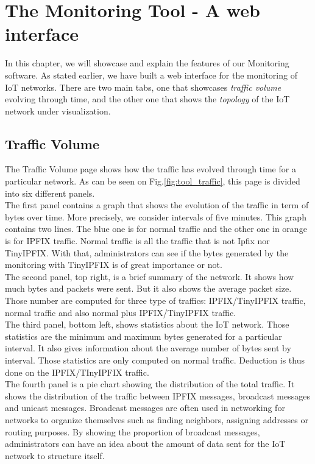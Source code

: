 \chapter{The Monitoring Tool - A web interface}

In this chapter, we will showcase and explain the features of our Monitoring software. As stated earlier, we have built a web interface for the monitoring of IoT networks. There are two main tabs, one that showcases \textit{traffic volume} evolving through time, and the other one that shows the \textit{topology} of the IoT network under visualization.

\section{Traffic Volume}

The Traffic Volume page shows how the traffic has evolved through time for a particular network. As can be seen on Fig.\ref{fig:tool_traffic}, this page is divided into six different panels. \\

The first panel contains a graph that shows the evolution of the traffic in term of bytes over time. More precisely, we consider intervals of five minutes. This graph contains two lines. The blue one is for normal traffic and the other one in orange is for IPFIX traffic. Normal traffic is all the traffic that is not Ipfix nor TinyIPFIX. With that, administrators can see if the bytes generated by the monitoring with TinyIPFIX is of great importance or not. \\

The second panel, top right, is a brief summary of the network. It shows how much bytes and packets were sent. But it also shows the average packet size. Those number are computed for three type of traffics: IPFIX/TinyIPFIX traffic, normal traffic and also normal plus IPFIX/TinyIPFIX traffic.\\

The third panel, bottom left, shows statistics about the IoT network. Those statistics are the minimum and maximum bytes generated for a particular interval. It also gives information about the average number of bytes sent by interval. Those statistics are only computed on normal traffic. Deduction is thus done on the IPFIX/TInyIPFIX traffic.\\

The fourth panel is a pie chart showing the distribution of the total traffic. It shows the distribution of the traffic between IPFIX messages, broadcast messages and unicast messages. Broadcast messages are often used in networking for networks to organize  themselves such as finding neighbors, assigning addresses or routing purposes. By showing the proportion of broadcast messages, administrators can have an idea about the amount of data sent for the IoT network to structure itself.\\


